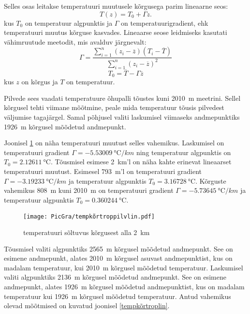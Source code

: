 \documentclass{trkut}%
\begin{document}
Selles osas leitakse temperatuuri muutusele kõrgusega parim lineaarne seos:
\begin{equation*}
T(z) = T_0 + \Gamma z.
\end{equation*}
kus $T_0$ on temperatuur algpunktis ja $\Gamma$ on temperatuurigradient, ehk temperatuuri muutus kõrguse kasvades. Lineaarse seose leidmiseks kasutati vähimruutude meetodit, mis avalduv järgnevalt:
\begin{equation*}
\Gamma = \frac{\sum_{i=1}^{n}(z_i - \overline{z})(T_i - \overline{T})}{\sum_{i=1}^{n}(z_i - \overline{z})^2}
\end{equation*}
\begin{equation*}
T_0 = \overline{T} - \Gamma \overline{z}
\end{equation*}
kus $z$ on kõrgus ja $T$ on temperatuur.

Pilvede sees vaadati temperatuure õhupalli tõustes kuni \SI{2010}{m} meetrini. Sellel kõrgusel tehti viimane mõõtmine, peale mida temperatuur tõusis pilvedest väljumise tagajärgel. Samal põhjusel valiti laskumisel viimaseks andmepunktiks \SI{1926}{m} kõrgusel mõõdetud andmepunkt.

Joonisel \ref{tempkõrtroppilvlin} on näha temperatuuri muutust selles vahemikus. Laskumisel on temperatuuri gradient $\Gamma =  \SI{-5.53009}{\degreeCelsius/km}$ ning temperatuur algpunktis on $T_0 = \SI{2.12611}{\degreeCelsius}$. Tõusmisel esimese \SI{2}{km}'l on näha kahte erinevat lineaarset temperatuuri muutust. Esimesel \SI{793}{m}'l on temperatuuri gradient $\Gamma =\SI{-3.19233}{\degreeCelsius/km}$ ja temperatuur algpunktis $T_0 = \SI{3.16728}{\degreeCelsius}$. Kõrguste vahemikus \SI{808}{m} kuni \SI{2010}{m} on temperatuuri gradient $\Gamma =\SI{-5.73645}{\degreeCelsius/km}$ ja temperatuur algpunktis $T_0 = \SI{0.360244}{\degreeCelsius}$.

\begin{figure}[h]
	\texttt{[image: PicGra/tempkõrtroppilvlin.pdf]}
	\caption{temperatuuri sõltuvus kõrgusest alla \SI{2}{km}}
	\label{tempkõrtroppilvlin}%
\end{figure}


Tõusmisel valiti algpunktiks \SI{2565}{m} kõrgusel mõõdetud andmepunkt. See on esimene andmepunkt, alates \SI{2010}{m} kõrgusel asuvast andmepunktist, kus on madalam temperatuur, kui \SI{2010}{m} kõrgusel mõõdetud temperatuur. Laskumisel valiti algpunktiks \SI{2136}{m} kõrgusel mõõdetud andmepunkt. See on esimene andmepunkt, alates \SI{1926}{m} kõrgusel mõõdetud andmepunktist, kus on madalam temperatuur kui \SI{1926}{m} kõrgusel mõõdetud temperatuur. Antud vahemikus olevad mõõtmised on kuvatud joonisel \ref{tempkõrtroplin}.
\end{document}
